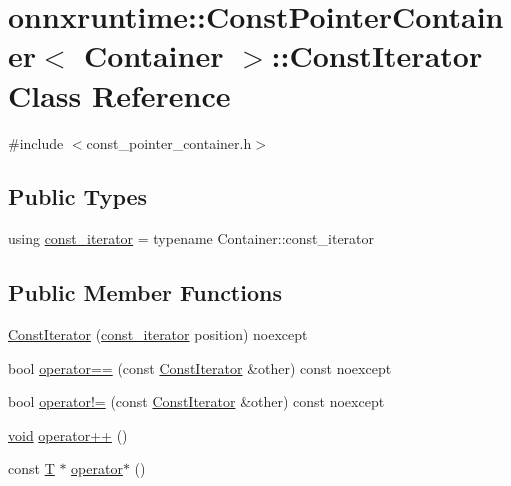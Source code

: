 \hypertarget{classonnxruntime_1_1ConstPointerContainer_1_1ConstIterator}{}\section{onnxruntime\+:\+:Const\+Pointer\+Container$<$ Container $>$\+:\+:Const\+Iterator Class Reference}
\label{classonnxruntime_1_1ConstPointerContainer_1_1ConstIterator}


{\ttfamily \#include $<$const\+\_\+pointer\+\_\+container.\+h$>$}

\subsection*{Public Types}
\begin{DoxyCompactItemize}
\item 
using \mbox{\hyperlink{classonnxruntime_1_1ConstPointerContainer_1_1ConstIterator_a54fdc540cf44e6b2c2ec0b2478e52f10}{const\+\_\+iterator}} = typename Container\+::const\+\_\+iterator
\end{DoxyCompactItemize}
\subsection*{Public Member Functions}
\begin{DoxyCompactItemize}
\item 
\mbox{\hyperlink{classonnxruntime_1_1ConstPointerContainer_1_1ConstIterator_a79c39a6fb33f40020a711f8b6b334038}{Const\+Iterator}} (\mbox{\hyperlink{classonnxruntime_1_1ConstPointerContainer_1_1ConstIterator_a54fdc540cf44e6b2c2ec0b2478e52f10}{const\+\_\+iterator}} position) noexcept
\item 
bool \mbox{\hyperlink{classonnxruntime_1_1ConstPointerContainer_1_1ConstIterator_a3ac7e9a7176851d89f4d2b0269cf473f}{operator==}} (const \mbox{\hyperlink{classonnxruntime_1_1ConstPointerContainer_1_1ConstIterator}{Const\+Iterator}} \&other) const noexcept
\item 
bool \mbox{\hyperlink{classonnxruntime_1_1ConstPointerContainer_1_1ConstIterator_a4ade631f17f370b56698548c32ed6ff1}{operator!=}} (const \mbox{\hyperlink{classonnxruntime_1_1ConstPointerContainer_1_1ConstIterator}{Const\+Iterator}} \&other) const noexcept
\item 
\mbox{\hyperlink{mlasi_8h_a88f941d423cb2a819b70a1358982b1a6}{void}} \mbox{\hyperlink{classonnxruntime_1_1ConstPointerContainer_1_1ConstIterator_abc80097bc9eb5285206a5820d833b259}{operator++}} ()
\item 
const \mbox{\hyperlink{classonnxruntime_1_1ConstPointerContainer_ae78936c3220735b7dba8004b7d5c9888}{T}} $\ast$ \mbox{\hyperlink{classonnxruntime_1_1ConstPointerContainer_1_1ConstIterator_aa3c479fb00b11f22de339109fd5f0bec}{operator$\ast$}} ()
\end{DoxyCompactItemize}


